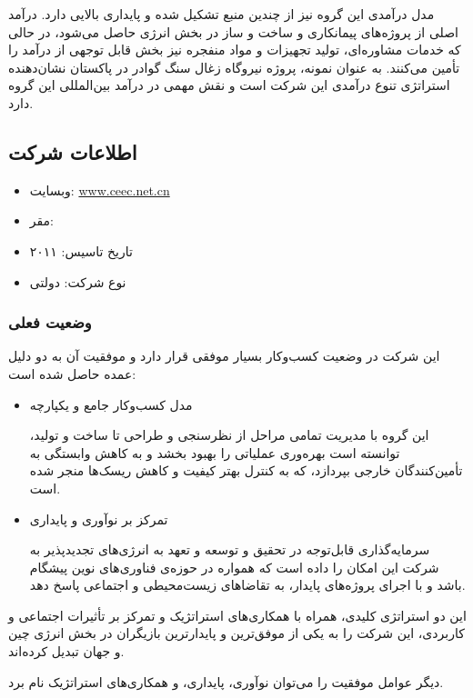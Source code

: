 \documentclass[dvipsnames, svgnames, x11names, 11pt, twocolumn]{article}
\begin{document}
مدل درآمدی این گروه نیز از چندین منبع تشکیل شده و پایداری بالایی دارد. درآمد اصلی از پروژه‌های پیمانکاری و ساخت و ساز در بخش انرژی حاصل می‌شود، در حالی که خدمات مشاوره‌ای، تولید تجهیزات و مواد منفجره نیز بخش قابل توجهی از درآمد را تأمین می‌کنند. به عنوان نمونه، پروژه نیروگاه زغال سنگ گوادر در پاکستان نشان‌دهنده استراتژی تنوع درآمدی این شرکت است و نقش مهمی در درآمد بین‌المللی این گروه دارد.

\subsection{اطلاعات شرکت}
\begin{itemize}
\item 
وبسایت:
\url{www.ceec.net.cn}

\item 
مقر:

\item 
تاریخ تاسیس: ۲۰۱۱

\item 
نوع شرکت: دولتی 
\end{itemize}

\subsubsection{وضعیت فعلی}
این شرکت در وضعیت کسب‌وکار بسیار موفقی قرار دارد و موفقیت آن به دو دلیل عمده حاصل شده است:

\begin{itemize}
\item 
مدل کسب‌وکار جامع و یکپارچه

این گروه با مدیریت تمامی مراحل از نظرسنجی و طراحی تا ساخت و تولید، توانسته است بهره‌وری عملیاتی را بهبود بخشد و به کاهش وابستگی به تأمین‌کنندگان خارجی بپردازد، که به کنترل بهتر کیفیت و کاهش ریسک‌ها منجر شده است.

\item 
تمرکز بر نوآوری و پایداری

سرمایه‌گذاری قابل‌توجه در تحقیق و توسعه و تعهد به انرژی‌های تجدیدپذیر به شرکت این امکان را داده است که همواره در حوزه‌ی فناوری‌های نوین پیشگام باشد و با اجرای پروژه‌های پایدار، به تقاضاهای زیست‌محیطی و اجتماعی پاسخ دهد.
\end{itemize}

این دو استراتژی کلیدی، همراه با همکاری‌های استراتژیک و تمرکز بر تأثیرات اجتماعی و کاربردی، این شرکت را به یکی از موفق‌ترین و پایدارترین بازیگران در بخش انرژی چین و جهان تبدیل کرده‌اند.

دیگر عوامل موفقیت را می‌توان نوآوری، پایداری، و همکاری‌های استراتژیک نام برد.   
\end{document}
